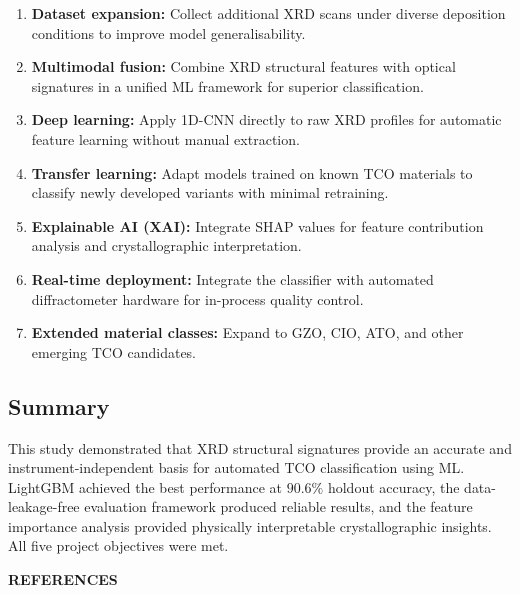 \documentclass[12pt, oneside]{article} %
\begin{document}
\begin{enumerate}[itemsep=0mm]
\item \textbf{Dataset expansion:} Collect additional XRD scans under diverse deposition conditions to improve model generalisability.

\item \textbf{Multimodal fusion:} Combine XRD structural features with optical signatures in a unified ML framework for superior classification.

\item \textbf{Deep learning:} Apply 1D-CNN directly to raw XRD profiles for automatic feature learning without manual extraction.

\item \textbf{Transfer learning:} Adapt models trained on known TCO materials to classify newly developed variants with minimal retraining.

\item \textbf{Explainable AI (XAI):} Integrate SHAP values for feature contribution analysis and crystallographic interpretation.

\item \textbf{Real-time deployment:} Integrate the classifier with automated diffractometer hardware for in-process quality control.

\item \textbf{Extended material classes:} Expand to GZO, CIO, ATO, and other emerging TCO candidates.
\end{enumerate}


\subsection{Summary}

This study demonstrated that XRD structural signatures provide an accurate and instrument-independent basis for automated TCO classification using ML. LightGBM achieved the best performance at $90.6\%$ holdout accuracy, the data-leakage-free evaluation framework produced reliable results, and the feature importance analysis provided physically interpretable crystallographic insights. All five project objectives were met.


\vfill \null

\newpage


\begin{center}
{}
\textbf{REFERENCES}
\end{center}
\end{document}
